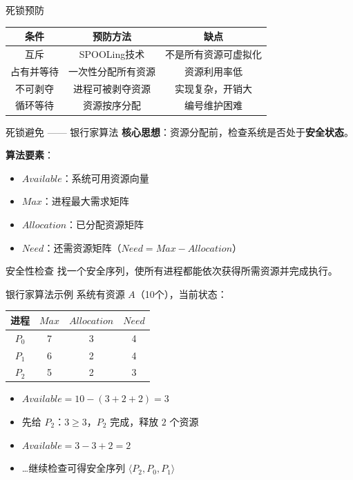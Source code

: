 \documentclass[10pt, aspectratio=169]{beamer}
\begin{document}
\begin{frame}{死锁预防}
    \begin{tabular}{|c|c|c|}
        \hline
        条件 & 预防方法 & 缺点 \\
        \hline
        互斥 & SPOOLing技术 & 不是所有资源可虚拟化 \\
        占有并等待 & 一次性分配所有资源 & 资源利用率低 \\
        不可剥夺 & 进程可被剥夺资源 & 实现复杂，开销大 \\
        循环等待 & 资源按序分配 & 编号维护困难 \\
        \hline
    \end{tabular}
\end{frame}

\begin{frame}{死锁避免 —— 银行家算法}
    \textbf{核心思想}：资源分配前，检查系统是否处于\textbf{安全状态}。

    \vspace{0.5em}
    \textbf{算法要素}：
    \begin{itemize}
        \item $Available$：系统可用资源向量
        \item $Max$：进程最大需求矩阵
        \item $Allocation$：已分配资源矩阵
        \item $Need$：还需资源矩阵（$Need = Max - Allocation$）
    \end{itemize}
    \vspace{0.5em}
    \begin{block}{安全性检查}
        找一个安全序列，使所有进程都能依次获得所需资源并完成执行。
    \end{block}
\end{frame}

\begin{frame}{银行家算法示例}
    系统有资源 $A$（10个），当前状态：

    \begin{tabular}{|c|c|c|c|}
        \hline
        进程 & $Max$ & $Allocation$ & $Need$ \\
        \hline
        $P_0$ & 7 & 3 & 4 \\
        $P_1$ & 6 & 2 & 4 \\
        $P_2$ & 5 & 2 & 3 \\
        \hline
    \end{tabular}
    \vspace{0.5em}
    \begin{itemize}
        \item $Available = 10 - (3+2+2) = 3$
        \item 先给 $P_2$：$3 \ge 3$，$P_2$ 完成，释放 $2$ 个资源
        \item $Available = 3-3+2 = 2$
        \item \dots 继续检查可得安全序列 $\langle P_2, P_0, P_1 \rangle$
    \end{itemize}
\end{frame}
\end{document}
